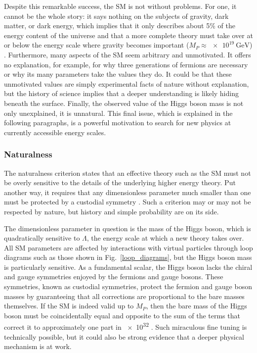 

Despite this remarkable success, the SM is not without problems. For one, it cannot be the whole story: it says nothing on the subjects of gravity, dark matter, or dark energy, which implies that it only describes about 5\% of the energy content of the universe \cite{fukugita_2004} and that a more complete theory must take over at or below the energy scale where gravity becomes important ($M_{P}\approx\SI{e19}{\GeV}$) \cite{giudice_naturalness_2008}. Furthermore, many aspects of the SM seem arbitrary and unmotivated. It offers no explanation, for example, for why three generations of fermions are necessary or why its many parameters take the values they do. It could be that these unmotivated values are simply experimental facts of nature without explanation, but the history of science implies that a deeper understanding is likely hiding beneath the surface. Finally, the observed value of the Higgs boson mass is not only unexplained, it is unnatural. This final issue, which is explained in the following paragraphs, is a powerful motivation to search for new physics at currently accessible energy scales.

\subsubsection{Naturalness}
The naturalness criterion states that an effective theory such as the SM must not be overly sensitive to the details of the underlying higher energy theory. Put another way, it requires that any dimensionless parameter much smaller than one must be protected by a custodial symmetry \cite{thooft_naturalness}. Such a criterion may or may not be respected by nature, but history and simple probability are on its side.

The dimensionless parameter in question is the mass of the Higgs boson, which is quadratically sensitive to $\Lambda$, the energy scale at which a new theory takes over. All SM parameters are affected by interactions with virtual particles through loop diagrams such as those shown in Fig.~\ref{loop_diagrams}, but the Higgs boson mass is particularly sensitive. As a fundamental scalar, the Higgs boson lacks the chiral and gauge symmetries enjoyed by the fermions and gauge bosons. These symmetries, known as custodial symmetries, protect the fermion and gauge boson masses by guaranteeing that all corrections are proportional to the bare masses themselves. If the SM is indeed valid up to $M_{P}$, then the bare mass of the Higgs boson must be coincidentally equal and opposite to the sum of the terms that correct it to approximately one part in \num{e32} \cite{giudice_naturalness_2008}. Such miraculous fine tuning is technically possible, but it could also be strong evidence that a deeper physical mechanism is at work.



